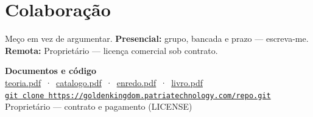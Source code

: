\documentclass[11pt,a4paper]{article}
\begin{document}
\section*{Colaboração}

Meço em vez de argumentar. \textbf{Presencial:} grupo, bancada e prazo --- escreva-me.
\textbf{Remota:} Proprietário — licença comercial sob contrato.

\medskip
\begin{center}\small
\textbf{Documentos e código}\\[3pt]
\href{https://goldenkingdom.patriatechnology.com/docs/teoria.pdf}{teoria.pdf}
\,·\,
\href{https://goldenkingdom.patriatechnology.com/docs/catalogo.pdf}{catalogo.pdf}
\,·\,
\href{https://goldenkingdom.patriatechnology.com/docs/enredo.pdf}{enredo.pdf}
\,·\,
\href{https://goldenkingdom.patriatechnology.com/docs/livro.pdf}{livro.pdf}
\\[2pt]
\href{https://goldenkingdom.patriatechnology.com/repo.git}{\texttt{git clone https://goldenkingdom.patriatechnology.com/repo.git}}
\\[3pt]
{\footnotesize\color{cinza}Proprietário — contrato e pagamento (LICENSE)}
\end{center}
\end{document}
